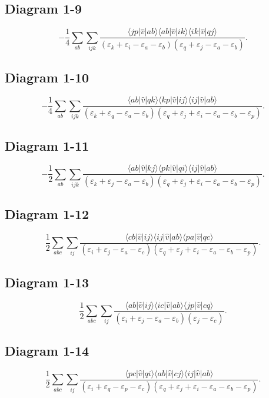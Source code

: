 \documentclass[aps,preprint,amsmath,amssymb]{revtex4-1}
\begin{document}
\subsection*{Diagram 1-9}
\[
-\frac{1}{4}\sum_{ab}\sum_{ijk}\frac{\langle jp| \hat{v} |ab  \rangle \langle ab| \hat{v} |ik  \rangle \langle ik| \hat{v} |qj  \rangle }{(\varepsilon_k+\varepsilon_i-\varepsilon_a-\varepsilon_b) (\varepsilon_q+\varepsilon_j-\varepsilon_a-\varepsilon_b)}.
\]


\subsection*{Diagram 1-10}
\[
-\frac{1}{4}\sum_{ab}\sum_{ijk}\frac{\langle ab| \hat{v} |qk  \rangle \langle kp| \hat{v} |ij  \rangle \langle ij| \hat{v} |ab  \rangle }{(\varepsilon_k+\varepsilon_q-\varepsilon_a-\varepsilon_b) (\varepsilon_q+\varepsilon_j+\varepsilon_i-\varepsilon_a-\varepsilon_b-\varepsilon_p)}.
\]


\subsection*{Diagram 1-11}
\[
-\frac{1}{2}\sum_{ab}\sum_{ijk}\frac{\langle ab| \hat{v} |kj  \rangle \langle pk| \hat{v} |qi  \rangle \langle ij| \hat{v} |ab  \rangle }{(\varepsilon_k+\varepsilon_j-\varepsilon_a-\varepsilon_b) (\varepsilon_q+\varepsilon_j+\varepsilon_i-\varepsilon_a-\varepsilon_b-\varepsilon_p)}.
\]


\subsection*{Diagram 1-12}
\[
\frac{1}{2}\sum_{abc}\sum_{ij}\frac{\langle cb| \hat{v} |ij  \rangle \langle ij| \hat{v} |ab  \rangle \langle pa| \hat{v} |qc  \rangle }{(\varepsilon_i+\varepsilon_j-\varepsilon_a-\varepsilon_c) (\varepsilon_q+\varepsilon_j+\varepsilon_i-\varepsilon_a-\varepsilon_b-\varepsilon_p)}.
\]

\subsection*{Diagram 1-13}
\[
\frac{1}{2}\sum_{abc}\sum_{ij}\frac{\langle ab| \hat{v} |ij  \rangle \langle ic| \hat{v} |ab  \rangle \langle jp| \hat{v} |cq  \rangle }{(\varepsilon_i+\varepsilon_j-\varepsilon_a-\varepsilon_b) (\varepsilon_j-\varepsilon_c)}.
\]

\subsection*{Diagram 1-14}
\[
\frac{1}{2}\sum_{abc}\sum_{ij}\frac{\langle pc| \hat{v} |qi  \rangle \langle ab| \hat{v} |cj  \rangle \langle ij| \hat{v} |ab  \rangle }{(\varepsilon_i+\varepsilon_q-\varepsilon_p-\varepsilon_c) (\varepsilon_q+\varepsilon_j+\varepsilon_i-\varepsilon_a-\varepsilon_b-\varepsilon_p)}.
\]
\end{document}
